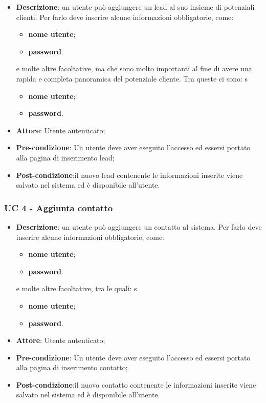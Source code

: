 \begin{itemize}
	\item \textbf{Descrizione}: un utente può aggiungere un lead al suo insieme di potenziali clienti. Per farlo deve inserire alcune informazioni obbligatorie, come:
	\begin{itemize}
		\item \textbf{nome utente};
		\item \textbf{password}.
	\end{itemize}
	e molte altre facoltative, ma che sono molto importanti al fine di avere una rapida e completa panoramica del potenziale cliente. Tra queste ci sono:
	s\begin{itemize}
		\item \textbf{nome utente};
		\item \textbf{password}.
	\end{itemize}
	\item \textbf{Attore}: Utente autenticato;
	\item \textbf{Pre-condizione}: Un utente deve aver eseguito l'accesso ed essersi portato alla pagina di inserimento lead;
	\item \textbf{Post-condizione}:il nuovo lead contenente le informazioni inserite viene salvato nel sistema ed è disponibile all'utente.
\end{itemize}

\subsubsection{UC 4 - Aggiunta contatto}

\begin{itemize}
	\item \textbf{Descrizione}: un utente può aggiungere un contatto al sistema. Per farlo deve inserire alcune informazioni obbligatorie, come:
	\begin{itemize}
		\item \textbf{nome utente};
		\item \textbf{password}.
	\end{itemize}
	e molte altre facoltative, tra le quali:
	s\begin{itemize}
		\item \textbf{nome utente};
		\item \textbf{password}.
	\end{itemize}
	\item \textbf{Attore}: Utente autenticato;
	\item \textbf{Pre-condizione}: Un utente deve aver eseguito l'accesso ed essersi portato alla pagina di inserimento contatto;
	\item \textbf{Post-condizione}:il nuovo contatto contenente le informazioni inserite viene salvato nel sistema ed è disponibile all'utente.
\end{itemize}

